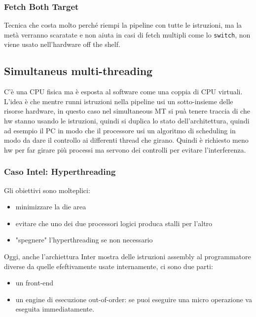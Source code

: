 \documentclass[12pt, oneside]{extbook} %
\begin{document}
\subsubsection{Fetch Both Target}
Tecnica che costa molto perché riempi la pipeline con tutte le istruzioni, ma la metà verranno scaratate e non aiuta in casi di fetch multipli come lo \texttt{switch}, non viene usato nell'hardware off the shelf.

\subsection{Simultaneus multi-threading}
C'è una CPU fisica ma è esposta al software come una coppia di CPU virtuali. L'idea è che mentre runni istruzioni nella pipeline usi un sotto-insieme delle risorse hardware, in questo caso nel simultaneous MT si puà tenere traccia di che hw stanno usando le istruzioni, quindi si duplica lo stato dell'architettura, quindi ad esempio il PC in modo che il processore usi un algoritmo di scheduling in modo da dare il controllo ai differenti thread che girano. Quindi è richiesto meno hw per far girare più processi ma servono dei controlli per evitare l'interferenza.
\subsubsection{Caso Intel: Hyperthreading}
Gli obiettivi sono molteplici:
\begin{itemize}
\item minimizzare la die area
\item evitare che uno dei due processori logici produca stalli per l'altro
\item "spegnere" l'hyperthreading se non necessario
\end{itemize}
Oggi, anche l'archiettura Inter mostra delle istruzioni assembly al programmatore diverse da quelle efeftivamente usate internamente, ci sono due parti:
\begin{itemize}
\item un front-end
\item un engine di esecuzione out-of-order: se puoi eseguire una micro operazione va eseguita immediatamente.
\end{itemize}
\end{document}
